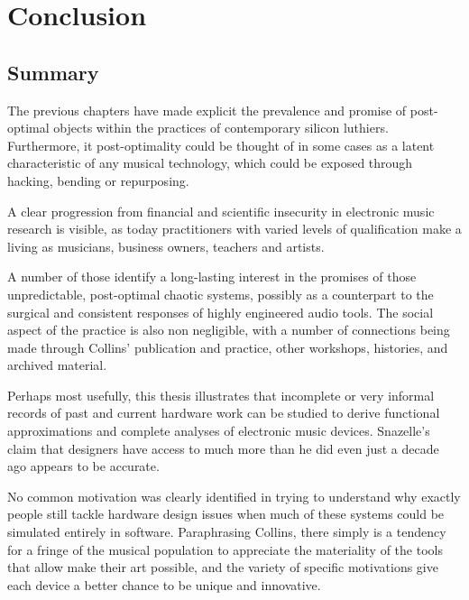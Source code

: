 \chapter{Conclusion}\label{conclusion}
 
\section{Summary}

The previous chapters have made explicit the prevalence and promise of post-optimal objects within the practices of contemporary silicon luthiers. Furthermore, it post-optimality could be thought of in some cases as a latent characteristic of any musical technology, which could be exposed through hacking, bending or repurposing. 

A clear progression from financial and scientific insecurity in electronic music research is visible, as today practitioners with varied levels of qualification make a living as musicians, business owners, teachers and artists. 

A number of those identify a long-lasting interest in the promises of those unpredictable, post-optimal chaotic systems, possibly as a counterpart to the surgical and consistent responses of highly engineered audio tools. The social aspect of the practice is also non negligible, with a number of connections being made through Collins' publication and practice, other workshops, histories, and archived material. 

Perhaps most usefully, this thesis illustrates that incomplete or very informal records of past and current hardware work can be studied to derive functional approximations and complete analyses of electronic music devices. Snazelle's claim that designers have access to much more than he did even just a decade ago appears to be accurate. 

No common motivation was clearly identified in trying to understand why exactly people still tackle hardware design issues when much of these systems could be simulated entirely in software. Paraphrasing Collins, there simply is a tendency for a fringe of the musical population to appreciate the materiality of the tools that allow make their art possible, and the variety of specific motivations give each device a better chance to be unique and innovative. 

